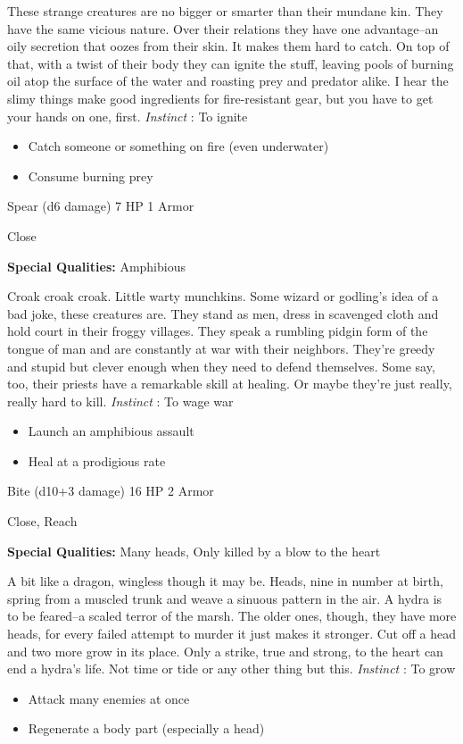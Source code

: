  These strange creatures are no bigger or smarter than their mundane kin. They have the same vicious nature. Over their relations they have one advantage--an oily secretion that oozes from their skin. It makes them hard to catch. On top of that, with a twist of their body they can ignite the stuff, leaving pools of burning oil atop the surface of the water and roasting prey and predator alike. I hear the slimy things make good ingredients for fire-resistant gear, but you have to get your hands on one, first. \emph{Instinct}
: To ignite
\begin{itemize}
\item Catch someone or something on fire (even underwater)
\item Consume burning prey

\end{itemize}




 Spear (d6 damage) 7 HP 1 Armor


 Close


 \textbf{Special Qualities:}
 Amphibious


 Croak croak croak. Little warty munchkins. Some wizard or godling's idea of a bad joke, these creatures are. They stand as men, dress in scavenged cloth and hold court in their froggy villages. They speak a rumbling pidgin form of the tongue of man and are constantly at war with their neighbors. They're greedy and stupid but clever enough when they need to defend themselves. Some say, too, their priests have a remarkable skill at healing. Or maybe they're just really, really hard to kill. \emph{Instinct}
: To wage war
\begin{itemize}
\item Launch an amphibious assault
\item Heal at a prodigious rate

\end{itemize}




 Bite (d10+3 damage) 16 HP 2 Armor


 Close, Reach


 \textbf{Special Qualities:}
 Many heads, Only killed by a blow to the heart


 A bit like a dragon, wingless though it may be. Heads, nine in number at birth, spring from a muscled trunk and weave a sinuous pattern in the air. A hydra is to be feared--a scaled terror of the marsh. The older ones, though, they have more heads, for every failed attempt to murder it just makes it stronger. Cut off a head and two more grow in its place. Only a strike, true and strong, to the heart can end a hydra's life. Not time or tide or any other thing but this. \emph{Instinct}
: To grow
\begin{itemize}
\item Attack many enemies at once
\item Regenerate a body part (especially a head)

\end{itemize}


